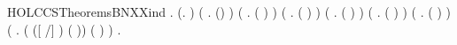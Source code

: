 \newcommand{\HOLCCSTheoremsBNXXdef}{\UseVerbatim{HOLCCSTheoremsBNXXdef}}
\begin{SaveVerbatim}{HOLCCSTheoremsBNXXind}
\HOLTokenTurnstile{} \HOLSymConst{\HOLTokenForall{}}.
       (\HOLSymConst{\HOLTokenForall{}}.   ) \HOLSymConst{\HOLTokenConj{}} (\HOLSymConst{\HOLTokenForall{}}  .    \HOLSymConst{\HOLTokenImp{}}  () ) \HOLSymConst{\HOLTokenConj{}}
       (\HOLSymConst{\HOLTokenForall{}}  .    \HOLSymConst{\HOLTokenConj{}}    \HOLSymConst{\HOLTokenImp{}}  ( \HOLSymConst{\ensuremath{+}} ) ) \HOLSymConst{\HOLTokenConj{}}
       (\HOLSymConst{\HOLTokenForall{}}  .    \HOLSymConst{\HOLTokenConj{}}    \HOLSymConst{\HOLTokenImp{}}  ( \HOLSymConst{\ensuremath{\parallel}} ) ) \HOLSymConst{\HOLTokenConj{}}
       (\HOLSymConst{\HOLTokenForall{}}  .    \HOLSymConst{\HOLTokenImp{}}  (\HOLConst{\ensuremath{\nu}}  ) ) \HOLSymConst{\HOLTokenConj{}}
       (\HOLSymConst{\HOLTokenForall{}}  .    \HOLSymConst{\HOLTokenImp{}}  (  ) ) \HOLSymConst{\HOLTokenConj{}}
       (\HOLSymConst{\HOLTokenForall{}} .  ( ) ) \HOLSymConst{\HOLTokenConj{}}
       (\HOLSymConst{\HOLTokenForall{}}  .
            (   \HOLSymConst{\HOLTokenImp{}}  ([  /] ) (  )) \HOLSymConst{\HOLTokenImp{}}
             (  ) ) \HOLSymConst{\HOLTokenImp{}}
       \HOLSymConst{\HOLTokenForall{}} .   
\end{SaveVerbatim}
